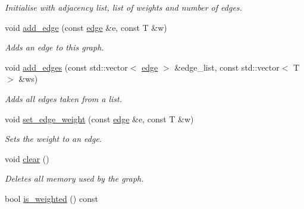 \begin{DoxyCompactItemize}
\begin{DoxyCompactList}\small\item\em Initialise with adjacency list, list of weights and number of edges. \end{DoxyCompactList}\item 
void \hyperlink{classlgraph_1_1wxgraph_a6b2aab113f6ce118ff437c6c182d9c6c}{add\-\_\-edge} (const \hyperlink{namespacelgraph_a76bd7d50719f03de7a85db259d80d572}{edge} \&e, const T \&w)
\begin{DoxyCompactList}\small\item\em Adds an edge to this graph. \end{DoxyCompactList}\item 
void \hyperlink{classlgraph_1_1wxgraph_a73b0fd5a842fcc862e32e293901892ec}{add\-\_\-edges} (const std\-::vector$<$ \hyperlink{namespacelgraph_a76bd7d50719f03de7a85db259d80d572}{edge} $>$ \&edge\-\_\-list, const std\-::vector$<$ T $>$ \&ws)
\begin{DoxyCompactList}\small\item\em Adds all edges taken from a list. \end{DoxyCompactList}\item 
void \hyperlink{classlgraph_1_1wxgraph_a9779e7b5d0a767d4b3c61a7c9a4c2449}{set\-\_\-edge\-\_\-weight} (const \hyperlink{namespacelgraph_a76bd7d50719f03de7a85db259d80d572}{edge} \&e, const T \&w)
\begin{DoxyCompactList}\small\item\em Sets the weight to an edge. \end{DoxyCompactList}\item 
void \hyperlink{classlgraph_1_1wxgraph_a5ce8055002673c718131a091b3f17fc0}{clear} ()
\begin{DoxyCompactList}\small\item\em Deletes all memory used by the graph. \end{DoxyCompactList}\item 
\hypertarget{classlgraph_1_1wxgraph_a12ed6499d974dafbbca857e00823ab9c}{bool \hyperlink{classlgraph_1_1wxgraph_a12ed6499d974dafbbca857e00823ab9c}{is\-\_\-weighted} () const }\label{classlgraph_1_1wxgraph_a12ed6499d974dafbbca857e00823ab9c}


\end{DoxyCompactItemize}
